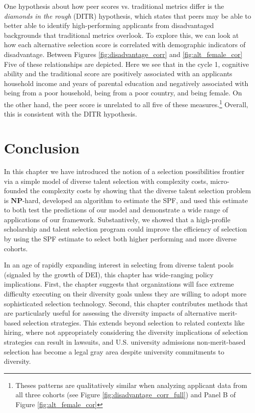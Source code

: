 One hypothesis about how peer scores vs. traditional metrics differ is the \emph{diamonds in the rough} (DITR) hypothesis, which states that peers may be able to better able to identify high-performing applicants from disadvantaged backgrounds that traditional metrics overlook. To explore this, we can look at how each alternative selection score is correlated with demographic indicators of disadvantage. Between Figures \ref{fig:disadvantage_corr} and \ref{fig:alt_female_cor} Five of these relationships are depicted. Here we see that in the cycle 1, cognitive ability and the traditional score are positively associated with an applicants household income and years of parental education and negatively associated with being from a poor household, being from a poor country, and being female. On the other hand, the peer score is unrelated to all five of these measures.\footnote{Theses patterns are qualitatively similar when analyzing applicant data from all three cohorts (see Figure \ref{fig:disadvantage_corr_full}) and Panel B of Figure \ref{fig:alt_female_cor}} Overall, this is consistent with the DITR hypothesis. 

\section{Conclusion} \label{sec:conclusion}

In this chapter we have introduced the notion of a selection possibilities frontier via a simple model of diverse talent selection with complexity costs, micro-founded the complexity costs by showing that the diverse talent selection problem is $\mathbf{NP}$-hard, developed an algorithm to estimate the SPF, and used this estimate to both test the predictions of our model and demonstrate a wide range of applications of our framework. Substantively, we showed that a high-profile scholarship and talent selection program could improve the efficiency of selection by using the SPF estimate to select both higher performing and more diverse cohorts. 

In an age of rapidly expanding interest in selecting from diverse talent pools (signaled by the growth of DEI), this chapter has wide-ranging policy implications. First, the chapter suggests that organizations will face extreme difficulty executing on their diversity goals unless they are willing to adopt more sophisticated selection technology. Second, this chapter contributes methods that are particularly useful for assessing the diversity impacts of alternative merit-based selection strategies. This extends beyond selection to related contexts like hiring, where not appropriately considering the diversity implications of selection strategies can result in lawsuits, and U.S. university admissions non-merit-based selection has become a legal gray area despite university commitments to diversity. 



